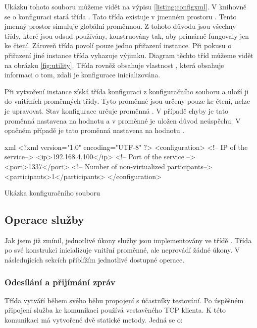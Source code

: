 Ukázku tohoto souboru můžeme vidět na výpisu \ref{listing:configxml}. V knihovně se o konfiguraci stará třída . Tato třída existuje v jmenném prostoru . Tento jmenný prostor simuluje globální proměnnou. Z tohoto důvodu jsou všechny třídy, které jsou odsud používány, konstruovány tak, aby primárně fungovaly jen ke čtení. Zároveň třída  povolí pouze jedno přiřazení instance. Při pokusu o přiřazení jiné instance třída vyhazuje výjimku. Diagram těchto tříd můžeme vidět na obrázku \ref{fig:utility}. Třída rovněž obsahuje vlastnost , která obsahuje informaci o tom, zdali je konfigurace inicializována.

Při vytvoření instance získá třída konfiguraci z konfiguračního souboru a uloží ji do vnitřních proměnných třídy. Tyto proměnné jsou určeny pouze ke čtení, nelze je upravovat. Stav konfigurace určuje proměnná . V případě chyby je tato proměnná nastavena na hodnotu  a v proměnné  je uložen důvod neúspěchu. V opačném případě je tato proměnná nastavena na hodnotu .

\begin{listing}[htbp]
    \centering
    \begin{cminted}{xml}
<?xml version="1.0" encoding="UTF-8" ?>
<configuration>
  <!-- IP of the service-->
  <ip>192.168.4.100</ip>
  <!-- Port of the service -->
  <port>1337</port>
  <!-- Number of non-virtualized participants-->
  <participants>1</participants>
</configuration>
    \end{cminted}
    \caption{Ukázka konfiguračního souboru}
    \label{listing:configxml}
\end{listing}


\subsection{Operace služby}

Jak jsem již zmínil, jednotlivé úkony služby jsou implementovány ve třídě . 
Třída po své konstrukci inicializuje vnitřní proměnné, ale neprovádí žádné úkony. V následujících sekcích přiblížím jednotlivé dostupné operace.

\subsubsection{Odesílání a přijímání zpráv}
Třída  vytváří během svého běhu propojení s účastníky testování. Po úspěšném připojení služba ke komunikaci používá vestavěného TCP klienta. K této komunikaci má vytvořené dvě statické metody. Jedná se o:

